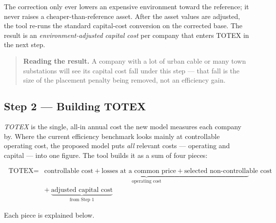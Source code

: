 The correction only ever lowers an expensive environment toward the reference; it
never raises a cheaper-than-reference asset. After the asset values are adjusted,
the tool re-runs the standard capital-cost conversion on the corrected base. The
result is an \emph{environment-adjusted capital cost} per company that enters
TOTEX in the next step.

\begin{quote}
\small
\textbf{Reading the result.} A company with a lot of urban cable or many town
substations will see its capital cost fall under this step --- that fall is the
size of the placement penalty being removed, not an efficiency gain.
\end{quote}


\subsection{Step 2 --- Building TOTEX}
\label{sec:step2}

\emph{TOTEX} is the single, all-in annual cost the new model measures each company
by. Where the current efficiency benchmark looks mainly at controllable operating
cost, the proposed model puts \emph{all} relevant costs --- operating and capital
--- into one figure. The tool builds it as a sum of four pieces:

\begin{equation}
\boxed{\;
\begin{aligned}
\text{TOTEX} ={}&
  \underbrace{\text{controllable cost} + \text{losses at a common price}
  + \text{selected non-controllable cost}}_{\text{operating cost}} \\[2pt]
  &+\ \underbrace{\text{adjusted capital cost}}_{\text{from Step 1}}
\end{aligned}
\;}
\end{equation}

Each piece is explained below.

